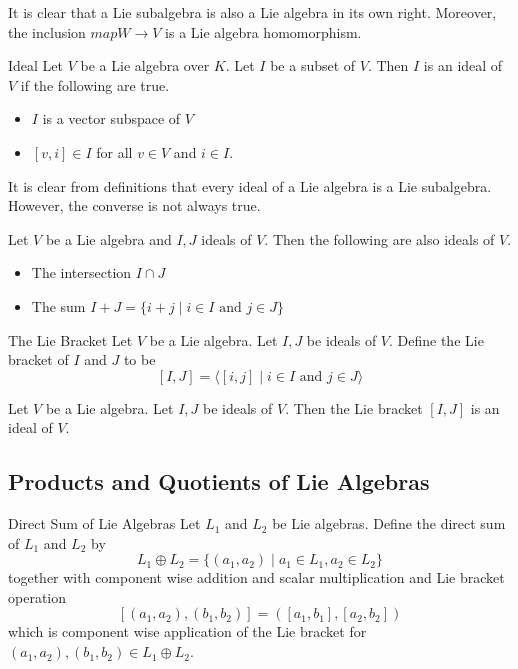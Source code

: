 \documentclass[a4paper]{article}
\begin{document}
It is clear that a Lie subalgebra is also a Lie algebra in its own right. Moreover, the inclusion $map W\to V$ is a Lie algebra homomorphism. 

\begin{defn}{Ideal}{} Let $V$ be a Lie algebra over $K$. Let $I$ be a subset of $V$. Then $I$ is an ideal of $V$ if the following are true. 
\begin{itemize}
\item $I$ is a vector subspace of $V$
\item $[v,i]\in I$ for all $v\in V$ and $i\in I$. 
\end{itemize}
\end{defn}

It is clear from definitions that every ideal of a Lie algebra is a Lie subalgebra. However, the converse is not always true. 

\begin{prp}{}{} Let $V$ be a Lie algebra and $I,J$ ideals of $V$. Then the following are also ideals of $V$. 
\begin{itemize}
\item The intersection $I\cap J$
\item The sum $I+J=\{i+j\;|\;i\in I\text{ and }j\in J\}$
\end{itemize}
\end{prp}

\begin{defn}{The Lie Bracket}{} Let $V$ be a Lie algebra. Let $I,J$ be ideals of $V$. Define the Lie bracket of $I$ and $J$ to be $$[I,J]=\langle[i,j]\;|\;i\in I\text{ and }j\in J\rangle$$
\end{defn}

\begin{lmm}{}{} Let $V$ be a Lie algebra. Let $I,J$ be ideals of $V$. Then the Lie bracket $[I,J]$ is an ideal of $V$. 
\end{lmm}

\subsection{Products and Quotients of Lie Algebras}
\begin{defn}{Direct Sum of Lie Algebras}{} Let $L_1$ and $L_2$ be Lie algebras. Define the direct sum of $L_1$ and $L_2$ by $$L_1\oplus L_2=\{(a_1,a_2)\;|\;a_1\in L_1,a_2\in L_2\}$$ together with component wise addition and scalar multiplication and Lie bracket operation $$[(a_1,a_2),(b_1,b_2)]=([a_1,b_1],[a_2,b_2])$$ which is component wise application of the Lie bracket for $(a_1,a_2),(b_1,b_2)\in L_1\oplus L_2$. 
\end{defn}
\end{document}
